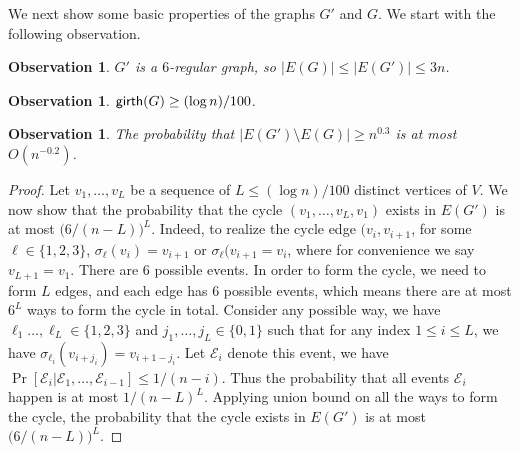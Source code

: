 \documentclass[11pt]{article}
\newtheorem{observation}[theorem]{Observation}
\theoremstyle{definition}
\newcommand{\gir}{\textnormal{\textsf{girth}}}
\newcounter{note}
\newcommand{\znote}[1]{\refstepcounter{note}$\ll${\bf ZT~\thenote:}
	{\sf \color{red} #1}$\gg$\marginpar{\tiny\bf ZT~\thenote}}
\begin{document}
\begin{titlepage}

We next show some basic properties of the graphs $G'$ and $G$. We start with the following observation.

\begin{observation}
$G'$ is a $6$-regular graph, so $|E(G)|\le |E(G')|\le 3n$.
\end{observation}

\begin{observation}
\label{obs: girth}
$\gir(G)\ge (\log n)/100$.
\end{observation}

\begin{observation}
The probability that $|E(G')\setminus E(G)|\ge n^{0.3}$ is at most $O(n^{-0.2})$.
\end{observation}
\begin{proof}
    Let $v_1,\ldots,v_L$ be a sequence of $L\le (\log n)/100$ distinct vertices of $V$. We now show that the probability that the cycle $(v_1,\ldots,v_L,v_1)$ exists in $E(G')$ is at most $\big(6/(n-L)\big)^{L}$. Indeed, to realize the cycle edge $(v_i,v_{i+1}$, for some $\ell \in \{1,2,3\}$, $\sigma_{\ell}(v_i)=v_{i+1}$ or $\sigma_{\ell}(v_{i+1}=v_i$, where for convenience we say $v_{L+1} = v_1$. There are $6$ possible events. In order to form the cycle, we need to form $L$ edges, and each edge has $6$ possible events, which means there are at most $6^L$ ways to form the cycle in total. Consider any possible way, we have $\ell_1 \dots, \ell_{L} \in \{1,2,3\}$ and $j_1, \dots, j_L \in \{0,1\}$ such that for any index $1 \le i \le L$, we have $\sigma_{\ell_i}(v_{i+j_i})=v_{i+1-j_i}$. Let $\mathcal{E}_i$ denote this event, we have $\Pr[\mathcal{E}_i | \mathcal{E}_1 , \dots, \mathcal{E}_{i-1}] \le 1/(n-i)$. Thus the probability that all events $\mathcal{E}_i$ happen is at most $1/(n-L)^L$. Applying union bound on all the ways to form the cycle, the probability that the cycle exists in $E(G')$ is at most $\big(6/(n-L)\big)^L$.



\end{proof}
\end{titlepage}
\end{document}
